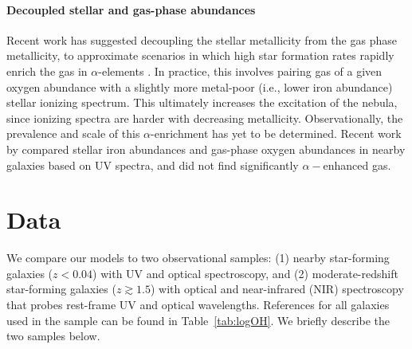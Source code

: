 \documentclass[preprint2]{aastex62}
\begin{document}
\paragraph{Decoupled stellar and gas-phase abundances} Recent work has suggested decoupling the stellar metallicity from the gas phase metallicity, to approximate scenarios in which high star formation rates rapidly enrich the gas in $\alpha$-elements \citep[e.g.,][]{Steidel+2016}. In practice, this involves pairing gas of a given oxygen abundance with a slightly more metal-poor (i.e., lower iron abundance) stellar ionizing spectrum. This ultimately increases the excitation of the nebula, since ionizing spectra are harder with decreasing metallicity. Observationally, the prevalence and scale of this $\alpha$-enrichment has yet to be determined. Recent work by \citet{Senchyna+2019} compared stellar iron abundances and gas-phase oxygen abundances in nearby galaxies based on UV spectra, and did not find significantly $\alpha-$enhanced gas.

\section{Data} \label{sec:data}

We compare our models to two observational samples: (1) nearby star-forming galaxies ($z<0.04$) with UV and optical spectroscopy, and (2) moderate-redshift star-forming galaxies ($z \gtrsim 1.5$) with optical and near-infrared (NIR) spectroscopy that probes rest-frame UV and optical wavelengths. References for all galaxies used in the sample can be found in Table~\ref{tab:logOH}. We briefly describe the two samples below.
\end{document}
